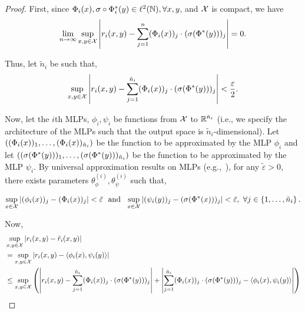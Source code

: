 \begin{proof}
    First, since $\Phi_i(x), \sigma \circ \Phi^*_i(y) \in \ell^2({\mathbb{N}}), \forall x, y$, and ${\mathcal{X}}$ is compact, we have
    \begin{equation*}
        \lim_{n \to \infty} \sup_{x,y \in {\mathcal{X}}} \left\lvert r_i(x, y) - \sum_{j=1}^{n} (\Phi_i(x))_j \cdot (\sigma(\Phi^*(y)))_j\right\rvert = 0.
    \end{equation*}

    Thus, let $\tilde{n}_i$ be such that,
    \begin{equation}\label{eq:thm1_proof_eq1}
        \sup_{x,y \in {\mathcal{X}}} \left\lvert r_i(x, y) - \sum_{j=1}^{\tilde{n}_i} (\Phi_i(x))_j \cdot (\sigma(\Phi^*(y)))_j\right\rvert < \frac{\varepsilon}{2}.
    \end{equation}

    Now, let the $i$th MLPs, $\phi_i, \psi_i$ be functions from ${\mathcal{X}}$ to $\mathbb{R}^{\tilde{n}_i}$ (i.e., we specify the architecture of the MLPs such that the output space is $\tilde{n}_i$-dimensional). Let $\left((\Phi_i(x))_1, \ldots, (\Phi_i(x))_{\tilde{n}_i}\right)$ be the function to be approximated by the MLP $\phi_i$ and let $\left((\sigma(\Phi^*(y)))_1, \ldots, (\sigma(\Phi^*(y)))_{\tilde{n}_i}\right)$ be the function to be approximated by the MLP $\psi_i$. By universal approximation results on MLPs (e.g.,~\parencite{barronUniversalApproximation1993, cybenkoApproximationSuperpositions1989, hornikMultilayerFeedforward1989}), for any $\tilde{\varepsilon} > 0$, there exists parameters $\theta_{\phi}^{(i)}, \theta_{\psi}^{(i)}$ such that,

    \begin{equation}\label{eq:thm1_proof_eq2}
        \sup_{x \in {\mathcal{X}}} \left\lvert(\phi_i(x))_j - (\Phi_i(x))_{j}\right\rvert < \tilde{\varepsilon} \ \text{ and } \ \sup_{x \in {\mathcal{X}}} \left\lvert(\psi_i(y))_j - (\sigma(\Phi^*(x)))_{j}\right\rvert < \tilde{\varepsilon}, \ \forall j \in \left\{1, \ldots, \tilde{n}_i\right\}.
    \end{equation}

    Now, 
    \begin{align*}
        &\sup_{x,y \in {\mathcal{X}}} \left\lvert r_i(x,y) - \tilde{r}_i(x,y)\right\rvert \\
        &= \sup_{x,y \in {\mathcal{X}}} \left\lvert r_i(x,y) - \left \langle \phi_i(x), \psi_i(y) \right\rangle\right\rvert \\
        &\leq \sup_{x,y\in {\mathcal{X}}} \left(\left\lvert r_i(x,y) - \sum_{j=1}^{\tilde{n}_i} (\Phi_i(x))_j \cdot (\sigma(\Phi^*(y)))_j\right\rvert + \left\lvert\sum_{j=1}^{\tilde{n}_i} (\Phi_i(x))_j \cdot (\sigma(\Phi^*(y)))_j - \left \langle \phi_i(x), \psi_i(y) \right\rangle\right\rvert\right) \\
    \end{align*}


\end{proof}
